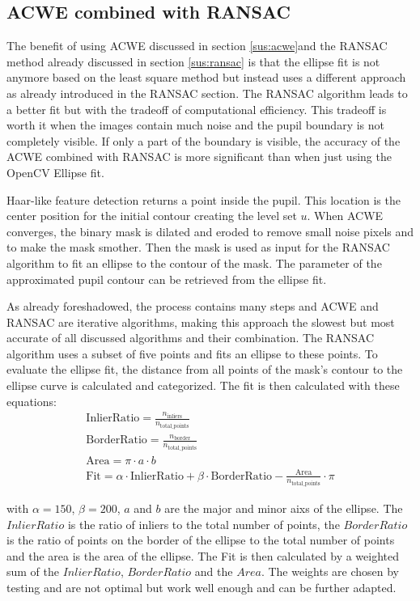 \subsection{ACWE combined with RANSAC}
\label{sus:acwe_ransac}
The benefit of using ACWE discussed in section \ref{sus:acwe}and the RANSAC method already discussed in section \ref{sus:ransac} is that the ellipse fit is not anymore based on the least square method but instead uses a different approach as already introduced in the RANSAC section. The RANSAC algorithm leads to a better fit but with the tradeoff of computational efficiency. This tradeoff is worth it when the images contain much noise and the pupil boundary is not completely visible. If only a part of the boundary is visible, the accuracy of the ACWE combined with RANSAC is more significant than when just using the OpenCV Ellipse fit.

Haar-like feature detection returns a point inside the pupil. This location is the center position for the initial contour creating the level set $u$. When ACWE converges, the binary mask is dilated and eroded to remove small noise pixels and to make the mask smother. Then the mask is used as input for the RANSAC algorithm to fit an ellipse to the contour of the mask. The parameter of the approximated pupil contour can be retrieved from the ellipse fit.

As already foreshadowed, the process contains many steps and ACWE and RANSAC are iterative algorithms, making this approach the slowest but most accurate of all discussed algorithms and their combination. The RANSAC algorithm uses a subset of five points and fits an ellipse to these points. To evaluate the ellipse fit, the distance from all points of the mask's contour to the ellipse curve is calculated and categorized. The fit is then calculated with these equations: 
\begin{gather}
    \text{InlierRatio} = \frac{n_{\text{inliers}}}{n_{\text{total\_points}}} \\
    \text{BorderRatio} = \frac{n_{\text{border}}}{n_{\text{total\_points}}} \\
    \text{Area} = \pi \cdot a \cdot b \\
    \text{Fit} = \alpha \cdot \text{InlierRatio} + \beta \cdot \text{BorderRatio} - \frac{\text{Area}}{n_{\text{total\_points}}} \cdot \pi
\end{gather}

with $\alpha = 150$, $\beta = 200$, $a$ and $b$ are the major and minor aixs of the ellipse. The $InlierRatio$ is the ratio of inliers to the total number of points, the $BorderRatio$ is the ratio of points on the border of the ellipse to the total number of points and the area is the area of the ellipse. The Fit is then calculated by a weighted sum of the $InlierRatio$, $BorderRatio$ and the $Area$. The weights are chosen by testing and are not optimal but work well enough and can be further adapted. 

